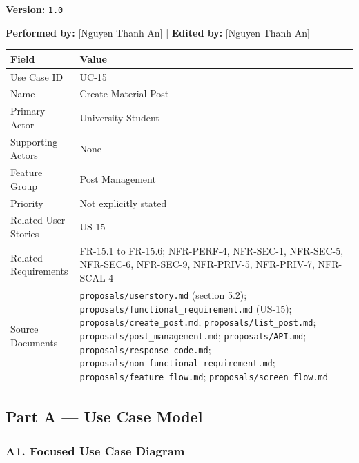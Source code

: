 \documentclass[12pt]{article}
\renewcommand{\baselinestretch}{1.5}
\begin{document}
\textbf{Version:} \texttt{1.0}
\par\medskip

\textbf{Performed by:} [Nguyen Thanh An] | \textbf{Edited by:} [Nguyen Thanh An]
\par\medskip

\begingroup
\small
\renewcommand{\baselinestretch}{1.0}\selectfont
\renewcommand{\arraystretch}{1.15}
\setlength{\tabcolsep}{6pt}
\begin{longtable}{|>{\raggedright\arraybackslash}p{}|>{\raggedright\arraybackslash}p{}|}
\hline
\textbf{Field} & \textbf{Value} \\ \hline
\endhead
Use Case ID & UC-15 \\ \hline
Name & Create Material Post \\ \hline
Primary Actor & University Student \\ \hline
Supporting Actors & None \\ \hline
Feature Group & Post Management \\ \hline
Priority & Not explicitly stated \\ \hline
Related User Stories & US-15 \\ \hline
Related Requirements & FR-15.1 to FR-15.6; NFR-PERF-4, NFR-SEC-1, NFR-SEC-5, NFR-SEC-6, NFR-SEC-9, NFR-PRIV-5, NFR-PRIV-7, NFR-SCAL-4 \\ \hline
Source Documents & \texttt{proposals/userstory.md} (section 5.2); \texttt{proposals/functional\_requirement.md} (US-15); \texttt{proposals/create\_post.md}; \texttt{proposals/list\_post.md}; \texttt{proposals/post\_management.md}; \texttt{proposals/API.md}; \texttt{proposals/response\_code.md}; \texttt{proposals/non\_functional\_requirement.md}; \texttt{proposals/feature\_flow.md}; \texttt{proposals/screen\_flow.md} \\ \hline
\end{longtable}
\endgroup
\par\medskip

\hypertarget{sec:part-a-use-case-model}{}
\subsection*{Part A --- Use Case Model}
\par\medskip

\hypertarget{sec:a1-focused-use-case-diagram}{}
\subsubsection*{A1. Focused Use Case Diagram}
\par\medskip
\end{document}
